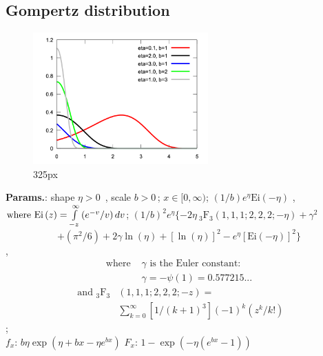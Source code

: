     
        
\subsection{Gompertz distribution}


    \begin{figure}[H]
        \centering
        \includegraphics[width=0.6\textwidth]{images/GompertzPDF.png}
        \caption{325px}
    \end{figure}




    {\color{darkblue} \textbf{Params.}:} {shape $\eta>0\,\!$ , scale $b > 0\,\!$}; {$x \in [0, \infty)\!$}; {$(1/b)e^{\eta}\text{Ei}\left(-\eta\right)$ ,  $ \text {where  Ei}\left(z\right)=\int\limits_{-z}^{\infty}\left(e^{-v}/v\right)dv$}; {$\left(1/b\right)^2 e^{\eta}\{-2\eta { \ }_3\text {F}_3 \left(1,1,1;2,2,2;-\eta\right)+\gamma^2$ $$+\left(\pi^2/6\right)+2\gamma\ln\left(\eta\right)+[\ln\left(\eta\right)]^2-e^{\eta}[\text{Ei}\left(-\eta \right)]^2\}$$ ,  \begin{align}\text{ where } &\gamma \text{ is the Euler constant: }\,\!\\ &\gamma=-\psi\left(1\right)=\text{0.577215... }\end{align} \begin{align}\text { and } { }_3\text {F}_3&\left(1,1,1;2,2,2;-z\right)=\\&\sum_{k=0}^\infty\left[1/\left(k+1\right)^3\right]\left(-1\right)^k\left(z^k/k!\right)\end{align}};\hspace{0.5cm}\\{\color{darkblue} \textbf{$f_x$}:} {$b\eta \exp\left(\eta + bx -\eta e^{bx} \right)$}{\color{darkblue} \textbf{$F_x$}:} {$1-\exp\left(-\eta\left(e^{bx}-1 \right)\right)$}



